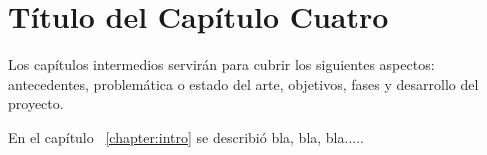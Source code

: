 
\chapter{Título del Capítulo Cuatro}
\label{chapter:cuatro}

Los capítulos intermedios servirán para cubrir los siguientes aspectos:
antecedentes, problemática o estado del arte, objetivos, fases y desarrollo del proyecto.



En el capítulo ~\ref{chapter:intro} se describió bla, bla, bla.....



